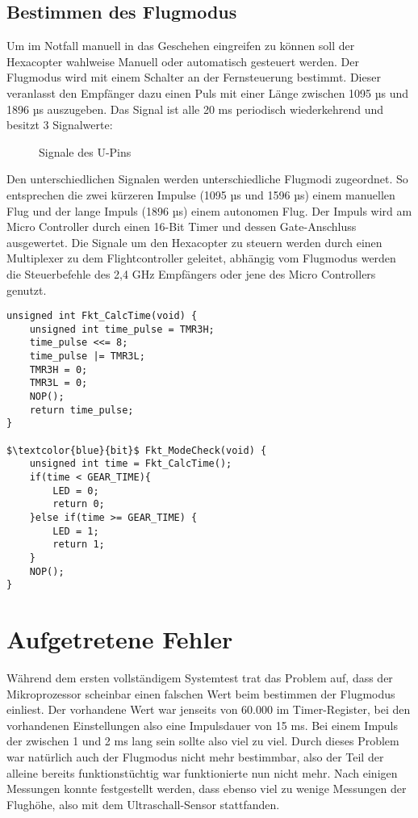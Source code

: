 \subsection{Bestimmen des Flugmodus}
Um im Notfall manuell in das Geschehen eingreifen zu können soll der Hexacopter wahlweise Manuell oder automatisch gesteuert werden.
Der Flugmodus wird mit einem Schalter an der Fernsteuerung bestimmt. Dieser veranlasst den Empfänger dazu einen Puls mit einer Länge zwischen 1095 µs und 1896 µs auszugeben. Das Signal ist alle 20 ms periodisch wiederkehrend und besitzt 3 Signalwerte:

\begin{figure}[H]
\caption{Signale des U-Pins}
\label{U-Signale}
\end{figure}
Den unterschiedlichen Signalen werden unterschiedliche Flugmodi zugeordnet. So entsprechen die zwei kürzeren Impulse (1095 µs und 1596 µs) einem manuellen Flug und der lange Impuls (1896 µs) einem autonomen Flug.
Der Impuls wird am Micro Controller durch einen 16-Bit Timer und dessen Gate-Anschluss ausgewertet.
Die Signale um den Hexacopter zu steuern werden durch einen Multiplexer zu dem Flightcontroller geleitet, abhängig vom Flugmodus werden die Steuerbefehle des 2,4 GHz Empfängers oder jene des Micro Controllers genutzt.

\lstset{language = c}
\begin{lstlisting}
unsigned int Fkt_CalcTime(void) {
    unsigned int time_pulse = TMR3H;
    time_pulse <<= 8;
    time_pulse |= TMR3L;
    TMR3H = 0;
    TMR3L = 0;
    NOP();
    return time_pulse;
}

$\textcolor{blue}{bit}$ Fkt_ModeCheck(void) {
    unsigned int time = Fkt_CalcTime();
    if(time < GEAR_TIME){
        LED = 0;
        return 0;
    }else if(time >= GEAR_TIME) {
        LED = 1;
        return 1;
    }
    NOP();
}
\end{lstlisting}

\section{Aufgetretene Fehler}
Während dem ersten vollständigem Systemtest trat das Problem auf, dass der Mikroprozessor scheinbar einen falschen Wert beim bestimmen der Flugmodus einliest. Der vorhandene Wert war jenseits von 60.000 im Timer-Register, bei den vorhandenen Einstellungen also \ca eine Impulsdauer von 15 ms. Bei einem Impuls der zwischen 1 und 2 ms lang sein sollte also viel zu viel.
Durch dieses Problem war natürlich auch der Flugmodus nicht mehr bestimmbar, also der Teil der alleine bereits funktionstüchtig war funktionierte nun nicht mehr. Nach einigen Messungen konnte festgestellt werden, dass ebenso viel zu wenige Messungen der Flughöhe, also mit dem Ultraschall-Sensor stattfanden.

